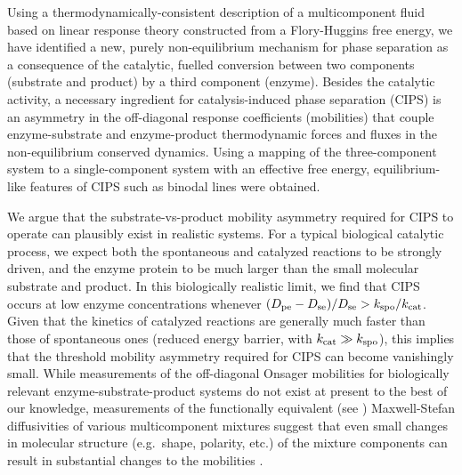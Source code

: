 Using a thermodynamically-consistent description of a multicomponent fluid based on linear response theory constructed from a Flory-Huggins free energy, we have identified a new, purely non-equilibrium mechanism for phase separation as a consequence of the catalytic, fuelled conversion between two components (substrate and product) by a third component (enzyme). Besides the catalytic activity, a necessary ingredient for catalysis-induced phase separation (CIPS) is an asymmetry in the off-diagonal response coefficients (mobilities) that couple enzyme-substrate and enzyme-product thermodynamic forces and fluxes in the non-equilibrium conserved dynamics. Using a mapping of the three-component system to a single-component system with an effective free energy, equilibrium-like features of CIPS such as binodal lines were obtained.


We argue that the substrate-vs-product mobility asymmetry required for CIPS to operate can plausibly exist in realistic systems. For a typical biological catalytic process, we expect both the spontaneous and catalyzed reactions to be strongly driven, and the enzyme protein to be much larger than the small molecular substrate and product. In this biologically realistic limit, we find \cite{suppmat} that CIPS occurs at low enzyme concentrations whenever ${(D_{\mathrm{pe}}-D_{\mathrm{se}})}/{D_{\mathrm{se}}} > {k_{\mathrm{spo}}}/{k_{\mathrm{cat}}}$. Given that the kinetics of catalyzed reactions are generally much faster than those of spontaneous ones (reduced energy barrier, with $k_{\mathrm{cat}}\gg k_{\mathrm{spo}}$), this implies that the threshold mobility asymmetry required for CIPS can become vanishingly small. While measurements of the off-diagonal Onsager mobilities for biologically relevant enzyme-substrate-product systems do not exist at present to the best of our knowledge, measurements of the functionally equivalent (see \cite{suppmat}) Maxwell-Stefan diffusivities of various multicomponent mixtures suggest that even small changes in molecular structure (e.g.~shape, polarity, etc.) of the mixture components can result in substantial changes to the mobilities \cite{taylor1993multicomponent,guevara2016mutual,guevara2018interplay,ramm2021diffusiophoretic,vanag2009cross}.





